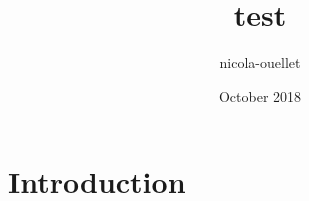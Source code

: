 \documentclass{article}
\title{test}
\author{nicola-ouellet }
\date{October 2018}
\begin{document}
\maketitle

\section{Introduction}
\end{document}
